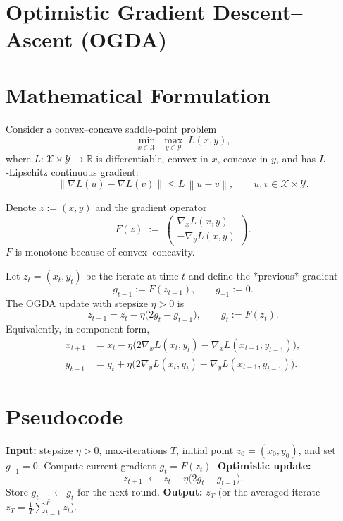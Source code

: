 \documentclass{article}
\newcommand{\R}{\mathbb{R}}
\newcommand{\norm}[1]{\left\lVert#1\right\rVert}
\begin{document}
\section*{Optimistic Gradient Descent–Ascent (OGDA)}

\section*{Mathematical Formulation}
Consider a convex–concave saddle‑point problem  
\[
\min_{x\in\mathcal X}\;\max_{y\in\mathcal Y}\;L(x,y),
\]
where $L:\mathcal X\times\mathcal Y\rightarrow\R$ is differentiable, convex in $x$, concave in $y$, and has $L$‑Lipschitz continuous gradient:
\[
\norm{\nabla L(u)-\nabla L(v)}\le L\,\norm{u-v},
\qquad 
u,v\in\mathcal X\times\mathcal Y .
\]

Denote $z:=(x,y)$ and the gradient operator
\[
F(z)\;:=\;
\begin{pmatrix}
\nabla_x L(x,y)\\[2mm]
-\nabla_y L(x,y)
\end{pmatrix}.
\]
$F$ is monotone because of convex–concavity.

Let $z_t=(x_t,y_t)$ be the iterate at time $t$ and define the *previous* gradient
\[
g_{t-1}:=F(z_{t-1}),\qquad g_{-1}:=0.
\]
The OGDA update with stepsize $\eta>0$ is
\[
\boxed{
\;z_{t+1}=z_t-\eta\bigl(2g_t-g_{t-1}\bigr),\qquad 
g_t:=F(z_t).\;}
\tag{1}
\]
Equivalently, in component form,
\[
\begin{aligned}
x_{t+1}&=x_t-\eta\bigl(2\nabla_x L(x_t,y_t)-\nabla_x L(x_{t-1},y_{t-1})\bigr),\\
y_{t+1}&=y_t+\eta\bigl(2\nabla_y L(x_t,y_t)-\nabla_y L(x_{t-1},y_{t-1})\bigr).
\end{aligned}
\tag{2}
\]

\section*{Pseudocode}
\begin{algorithm}[H]
\caption{Optimistic Gradient Descent–Ascent (OGDA)}
\begin{algorithmic}[1]
\STATE \textbf{Input:} stepsize $\eta>0$, max‑iterations $T$,
initial point $z_0=(x_0,y_0)$, and set $g_{-1}=0$.
    \STATE Compute current gradient $g_t = F(z_t)$.
    \STATE \textbf{Optimistic update:}
    \[
    z_{t+1}\;\gets\;z_t-\eta\bigl(2g_t-g_{t-1}\bigr).
    \]
    \STATE Store $g_{t-1}\gets g_t$ for the next round.
\ENDFOR
\STATE \textbf{Output:} $z_T$ (or the averaged iterate $\bar z_T=\frac1T\sum_{t=1}^T z_t$).
\end{algorithmic}
\end{algorithm}
\end{document}
